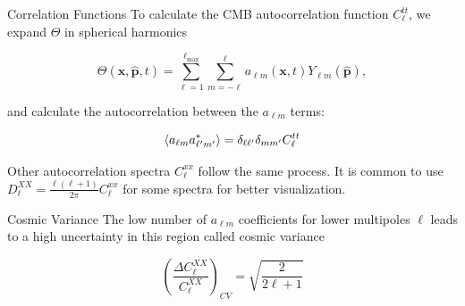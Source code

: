 \documentclass[serif, aspectratio=169]{beamer}
\begin{document}
\begin{frame}{Correlation Functions}
To calculate the CMB autocorrelation function $C_\ell^{tt}$, we expand $\Theta$ in spherical harmonics

\begin{equation}
    \Theta(\mathbf{x}, \hat{\mathbf{p}},t)=\sum_{\ell=1}^{\ell_\text{max}}\sum_{m=-\ell}^\ell a_{\ell m}(\mathbf{x},t)Y_{\ell m}(\hat{\mathbf{p}}),
\end{equation}

and calculate the autocorrelation between the $a_{\ell m}$ terms:

\begin{equation}
    \left\langle a_{\ell m} a_{\ell' m'}^* \right\rangle=\delta_{\ell \ell'}\delta_{m m'}C_\ell^{tt}
\end{equation}

Other autocorrelation spectra $C_\ell^{xx}$ follow the same process. It is common to use $D_\ell^{XX}=\frac{\ell(\ell+1)}{2\pi}C_\ell^{xx}$ for some spectra for better visualization.

\end{frame}

\begin{frame}{Cosmic Variance}
    The low number of $a_{\ell m}$ coefficients for lower multipoles $\ell$ leads to a high uncertainty in this region called cosmic variance

    \begin{equation}\label{cosmic_variance}
        \left(\frac{\Delta C_\ell^{XX}}{C_\ell^{XX}}\right)_{CV}=\sqrt{\frac{2}{2\ell+1}}
    \end{equation}
\end{frame}
\end{document}

